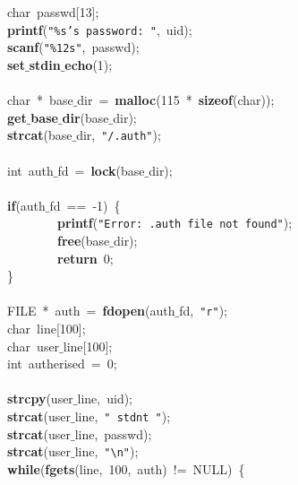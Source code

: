 \mbox{}\ \ \ \ \ \ \ \ char\ passwd[13]; \\
\mbox{}\ \ \ \ \ \ \ \ \textbf{printf}(\texttt{"{}\%s's\ password:\ "{}},\ uid); \\
\mbox{}\ \ \ \ \ \ \ \ \textbf{scanf}(\texttt{"{}\%12s"{}},\ passwd); \\
\mbox{}\ \ \ \ \ \ \ \ \textbf{set$\_$stdin$\_$echo}(1); \\
\mbox{} \\
\mbox{}\ \ \ \ \ \ \ \ char\ *\ base$\_$dir\ =\ \textbf{malloc}(115\ *\ \textbf{sizeof}(char)); \\
\mbox{}\ \ \ \ \ \ \ \ \textbf{get$\_$base$\_$dir}(base$\_$dir); \\
\mbox{}\ \ \ \ \ \ \ \ \textbf{strcat}(base$\_$dir,\ \texttt{"{}/.auth"{}}); \\
\mbox{} \\
\mbox{}\ \ \ \ \ \ \ \ int\ auth$\_$fd\ =\ \textbf{lock}(base$\_$dir); \\
\mbox{}\ \ \ \ \ \ \ \  \\
\mbox{}\ \ \ \ \ \ \ \ \textbf{if}(auth$\_$fd\ ==\ -1)\ \{ \\
\mbox{}\ \ \ \ \ \ \ \ \ \ \ \ \ \ \ \ \textbf{printf}(\texttt{"{}Error:\ .auth\ file\ not\ found"{}}); \\
\mbox{}\ \ \ \ \ \ \ \ \ \ \ \ \ \ \ \ \textbf{free}(base$\_$dir); \\
\mbox{}\ \ \ \ \ \ \ \ \ \ \ \ \ \ \ \ \textbf{return}\ 0; \\
\mbox{}\ \ \ \ \ \ \ \ \} \\
\mbox{} \\
\mbox{}\ \ \ \ \ \ \ \ FILE\ *\ auth\ =\ \textbf{fdopen}(auth$\_$fd,\ \texttt{"{}r"{}}); \\
\mbox{}\ \ \ \ \ \ \ \ char\ line[100]; \\
\mbox{}\ \ \ \ \ \ \ \ char\ user$\_$line[100]; \\
\mbox{}\ \ \ \ \ \ \ \ int\ autherised\ =\ 0; \\
\mbox{} \\
\mbox{}\ \ \ \ \ \ \ \ \textbf{strcpy}(user$\_$line,\ uid); \\
\mbox{}\ \ \ \ \ \ \ \ \textbf{strcat}(user$\_$line,\ \texttt{"{}\ stdnt\ "{}}); \\
\mbox{}\ \ \ \ \ \ \ \ \textbf{strcat}(user$\_$line,\ passwd); \\
\mbox{}\ \ \ \ \ \ \ \ \textbf{strcat}(user$\_$line,\ \texttt{"{}}\texttt{\textbackslash{}n}\texttt{"{}}); \\
\mbox{}\ \ \ \ \ \ \ \ \textbf{while}(\textbf{fgets}(line,\ 100,\ auth)\ !=\ NULL)\ \{ \\

